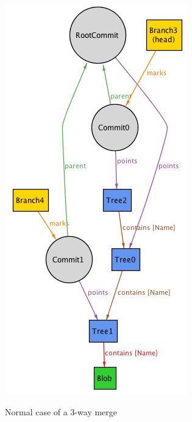 \begin{figure} 
	\caption{Normal case of a 3-way merge}
	\centering
	\includegraphics[scale=0.65]{images/normalmerge.png}
	\label{fig:merge}
\end{figure}

